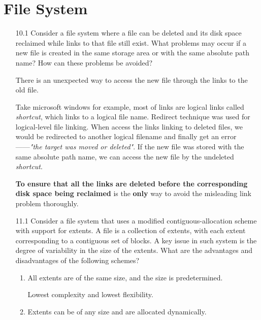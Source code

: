 \chapter{File System}

\begin{enumerate}
    \item [10.1] Consider a file system where a file can be deleted and its disk space reclaimed while links to that file still exist. What problems may occur if a new file is created in the same storage area or with the same absolute path name? How can these problems be avoided?
    
    There is an unexpected way to access the new file through the links to the old file.
    
    Take microsoft windows for example, most of links are logical links called \textit{shortcut}, which links to a logical file name. Redirect technique was used for logical-level file linking. When access the links linking to deleted files, we would be redirected to another logical filename and finally get an error——\textit{"the target was moved or deleted"}. If the new file was stored with the same absolute path name, we can access the new file by the undeleted \textit{shortcut}.
    
    \textbf{To ensure that all the links are deleted before the corresponding disk space being reclaimed} is the \textbf{only} way to avoid the misleading link problem \footnotemark thoroughly.
    
    
    \item [11.1] Consider a file system that uses a modified contiguous-allocation scheme with support for extents. A file is a collection of extents, with each extent corresponding to a contiguous set of blocks. A key issue in such system is the degree of variability in the size of the extents. What are the advantages and disadvantages of the following schemes?
    
    \begin{enumerate}
        \item All extents are of the same size, and the size is predetermined.
        
        Lowest complexity and lowest flexibility.
        
        \item Extents can be of any size and are allocated dynamically.
        

\end{enumerate}
\end{enumerate}
